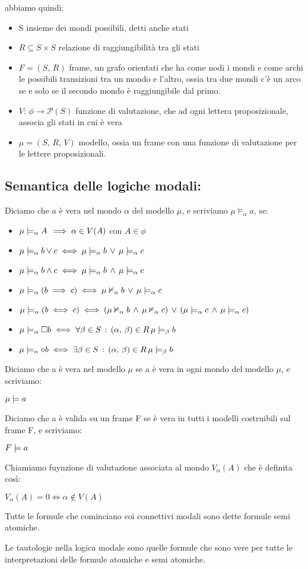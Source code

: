 abbiamo quindi:
\begin{itemize}
\item S insieme dei mondi possibili, detti anche stati
\item $R\subseteq S\times S$ relazione di raggiungibilità tra gli stati
\item $F=(S,\, R)$ frame, un grafo orientati che ha come nodi i mondi e
come archi le possibili transizioni tra un mondo e l'altro, ossia
tra due mondi c'è un arco se e solo se il secondo mondo è raggiungibile
dal primo.
\item $V:\,\phi\longrightarrow\mathcal{P}(S)$ funzione di valutazione,
che ad ogni lettera proposizionale, associa gli stati in cui è vera
\item $\mu=(S,\, R,\, V)$ modello, ossia un frame con una funzione di valutazione
per le lettere proposizionali.
\end{itemize}

\subsection{Semantica delle logiche modali:}

Diciamo che $a$ è vera nel mondo $\alpha$ del modello $\mu$, e
scriviamo $\mu\models_{\alpha}a$, se:
\begin{itemize}
\item $\mu\models_{\alpha}A\,\implies\alpha\in V(A)$ con $A\in\phi$ 
\item $\mu\models_{\alpha}b\vee c\iff\mu\models_{\alpha}b\,\vee\,\mu\models_{\alpha}c$
\item $\mu\models_{\alpha}b\wedge c\iff\mu\models_{\alpha}b\,\wedge\,\mu\models_{\alpha}c$
\item $\mu\models_{\alpha}(b\implies c)\iff\mu\nvDash_{\alpha}b\,\vee\,\mu\models_{\alpha}c$
\item $\mu\models_{\alpha}(b\iff c)\iff(\mu\nvDash_{\alpha}b\,\wedge\,\mu\nvDash_{\alpha}c)\,\vee\,(\mu\models_{\alpha}c\,\wedge\,\mu\models_{\alpha}c)$
\item $\mu\models_{\alpha}\square b\iff\forall\beta\in S\,:\,(\alpha,\,\beta)\in R\,\mu\models_{\beta}b$
\item $\mu\models_{\alpha}\diamond b\iff\exists\beta\in S\,:\,(\alpha,\,\beta)\in R\,\mu\models_{\beta}b$
\end{itemize}
Diciamo che a è vera nel modello $\mu$ se a è vera in ogni mondo
del modello $\mu$, e scriviamo:

$\mu\models a$ 

Diciamo che a è valida su un frame F se è vera in tutti i modelli
costruibili sul frame F, e scriviamo:

$F\models a$

Chiamiamo fuynzione di valutazione associata al mondo $V_{\alpha}(A)$
che è definita così:

$V_{\alpha}(A)=0\iff\alpha\notin V(A)$

Tutte le formule che cominciano coi connettivi modali sono dette formule
semi atomiche.

Le tautologie nella logica modale sono quelle formule che sono vere
per tutte le interpretazioni delle formule atomiche e semi atomiche.
